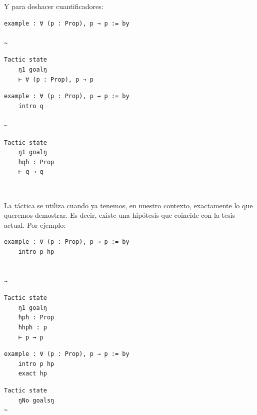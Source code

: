 Y para deshacer cuantificadores:

\begin{minipage}[t]{0.58\textwidth}
\begin{lstlisting}[language=lean]
  example : ∀ (p : Prop), p → p := by

~
\end{lstlisting}
\end{minipage}%
\hfill
\begin{minipage}[t]{0.40\textwidth}
\begin{lstlisting}[language=infoview]
  Tactic state
    ŋ1 goalŋ
    ⊢ ∀ (p : Prop), p → p
\end{lstlisting}
\end{minipage}
%
\noindent
\makebox[\textwidth]{$\downarrow$}
%
\begin{minipage}[t]{0.58\textwidth}
\begin{lstlisting}[language=lean]
  example : ∀ (p : Prop), p → p := by
    intro q

~
\end{lstlisting}
\end{minipage}%
\hfill
\begin{minipage}[t]{0.40\textwidth}
\begin{lstlisting}[language=infoview]
  Tactic state
    ŋ1 goalŋ
    ħqħ : Prop
    ⊢ q → q
\end{lstlisting}
\end{minipage}


\vspace{1em}
\noindent\textbf{$~$ }

La táctica  se utiliza cuando ya tenemos, en nuestro contexto, exactamente lo que queremos demostrar. Es decir, existe una hipótesis que coincide con la tesis actual. Por ejemplo:

\begin{minipage}[t]{0.58\textwidth}
\begin{lstlisting}[language=lean]
  example : ∀ (p : Prop), p → p := by
    intro p hp


~
\end{lstlisting}
\end{minipage}%
\hfill
\begin{minipage}[t]{0.40\textwidth}
\begin{lstlisting}[language=infoview]
  Tactic state
    ŋ1 goalŋ
    ħpħ : Prop
    ħhpħ : p
    ⊢ p → p
\end{lstlisting}
\end{minipage}
%
\noindent
\makebox[\textwidth]{$\downarrow$}
%
\begin{minipage}[t]{0.58\textwidth}
\begin{lstlisting}[language=lean]
  example : ∀ (p : Prop), p → p := by
    intro p hp
    exact hp
\end{lstlisting}
\end{minipage}%
\hfill
\begin{minipage}[t]{0.40\textwidth}
\begin{lstlisting}[language=infoview]
  Tactic state
    ŋNo goalsŋ
~
\end{lstlisting}
\end{minipage}


